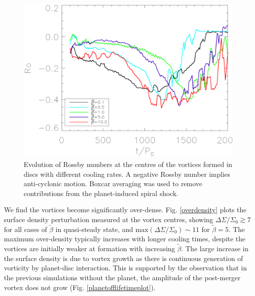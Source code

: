 \begin{figure}
  \includegraphics[width=\linewidth,clip=true,trim=0.5cm
  0cm 0cm 1cm]{figures/rossby}
  \caption{Evolution of Rossby numbers at the centres of the vortices
    formed in discs with different cooling rates. A negative Rossby
    number implies anti-cyclonic motion. Boxcar averaging
    was used to remove contributions from the planet-induced spiral shock.\label{rossbyplot}}    
\end{figure}

We find the vortices become significantly 
over-dense. Fig. \ref{overdensity} plots the surface density perturbation measured at the
vortex centres, showing $\Delta\Sigma/\Sigma_0 \gtrsim 7$ for all
cases of $\tilde\beta$ in quasi-steady state, and 
$\mathrm{max}(\Delta\Sigma/\Sigma_0)\sim 11$ for $\tilde\beta=5$.  
The maximum over-density typically increases with longer cooling
times, despite the vortices are initially weaker at formation with
increasing $\tilde{\beta}$. The large increase in the surface density
is due to vortex growth as there is continuous generation of vorticity by
planet-disc interaction. This is supported by the observation that in
the previous simulations without the planet, the amplitude of
the post-merger vortex does not grow (Fig. 
\ref{planetofflifetimeplot}).  


